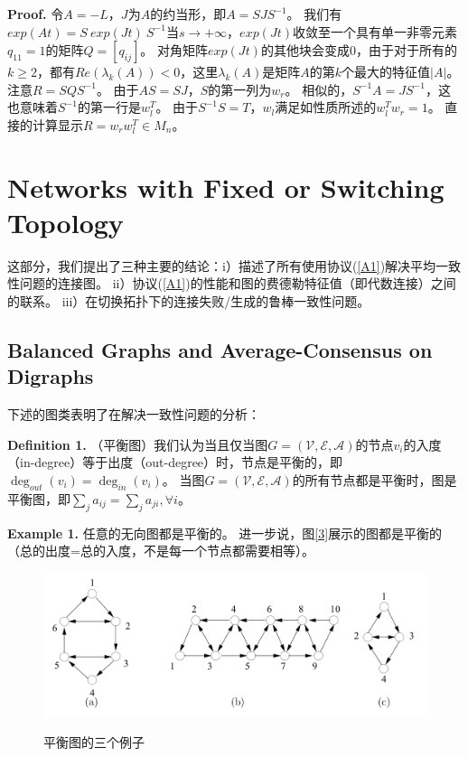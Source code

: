 \documentclass{article}
\begin{document}
\noindent \textbf{Proof.} 令$A=-L$，$J$为$A$的约当形，即$A=SJS^{-1}$。
我们有$exp(At) = S\ exp(Jt)\ S^{-1}$当$s\rightarrow +\infty$，$exp(Jt)$收敛至一个具有单一非零元素$q_{11}=1$的矩阵$Q=[q_{ij}]$。
对角矩阵$exp(Jt)$的其他块会变成0，由于对于所有的$k\ge2$，都有$Re(\lambda_k(A))<0$，这里$\lambda_k(A)$是矩阵$A$的第$k$个最大的特征值$|A|$。
注意$R=SQS^{-1}$。
由于$AS=SJ$，$S$的第一列为$w_r$。
相似的，$S^{-1}A = JS^{-1}$，这也意味着$S^{-1}$的第一行是$w_l^T$。
由于$S^{-1}S=T$，$w_l$满足如性质所述的$w_l^Tw_r=1$。
直接的计算显示$R=w_rw_l^T\in M_n$。


\section{Networks with Fixed or Switching Topology}
这部分，我们提出了三种主要的结论：i）描述了所有使用协议(\ref{A1})解决平均一致性问题的连接图。
ii）协议(\ref{A1})的性能和图的费德勒特征值（即代数连接）之间的联系。
iii）在切换拓扑下的连接失败/生成的鲁棒一致性问题。

\subsection{Balanced Graphs and Average-Consensus on Digraphs}
下述的图类表明了在解决一致性问题的分析：

\noindent \textbf{Definition 1.} （平衡图）我们认为当且仅当图$G=(\mathcal{V}, \mathcal{E}, \mathcal{A})$的节点$v_i$的入度（in-degree）等于出度（out-degree）时，节点是平衡的，即$\deg_{out}(v_i)=\deg_{in}(v_i)$。
当图$G=(\mathcal{V}, \mathcal{E}, \mathcal{A})$的所有节点都是平衡时，图是平衡图，即$\sum_{j}a_{ij} = \sum_{j}a_{ji}, \forall i$。

\noindent \textbf{Example 1.} 任意的无向图都是平衡的。
进一步说，图\ref{3}展示的图都是平衡的{\color{userColor}（总的出度=总的入度，不是每一个节点都需要相等）}。
\begin{figure}[htbp]
    \centering
    \includegraphics[width=12cm]{figures/Fig3-BalancedGraphs.jpeg}
    \label{BalancedGraphs}
    \caption{平衡图的三个例子}
\end{figure}
\end{document}
